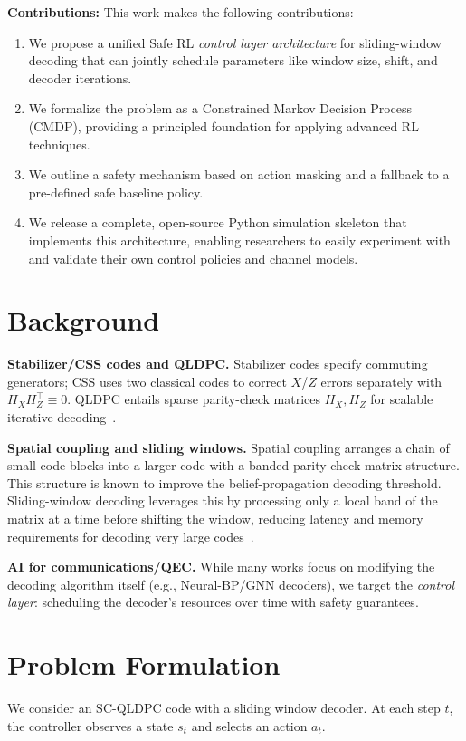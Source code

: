 \documentclass[conference]{IEEEtran}
\begin{document}
\textbf{Contributions:}
This work makes the following contributions:
\begin{enumerate}
    \item We propose a unified Safe RL \emph{control layer architecture} for sliding-window decoding that can jointly schedule parameters like window size, shift, and decoder iterations.
    \item We formalize the problem as a Constrained Markov Decision Process (CMDP), providing a principled foundation for applying advanced RL techniques.
    \item We outline a safety mechanism based on action masking and a fallback to a pre-defined safe baseline policy.
    \item We release a complete, open-source Python simulation skeleton that implements this architecture, enabling researchers to easily experiment with and validate their own control policies and channel models.
\end{enumerate}

\section{Background}
\textbf{Stabilizer/CSS codes and QLDPC.} Stabilizer codes specify commuting generators; CSS uses two classical codes to correct $X$/$Z$ errors separately with $H_X H_Z^\top \equiv 0$. QLDPC entails sparse parity-check matrices $H_X,H_Z$ for scalable iterative decoding~\cite{panteleev2021quantum}.

\textbf{Spatial coupling and sliding windows.} Spatial coupling arranges a chain of small code blocks into a larger code with a banded parity-check matrix structure. This structure is known to improve the belief-propagation decoding threshold. Sliding-window decoding leverages this by processing only a local band of the matrix at a time before shifting the window, reducing latency and memory requirements for decoding very large codes~\cite{fosson2021survey}.

\textbf{AI for communications/QEC.} While many works focus on modifying the decoding algorithm itself (e.g., Neural-BP/GNN decoders), we target the \emph{control layer}: scheduling the decoder's resources over time with safety guarantees.

\section{Problem Formulation}
We consider an SC-QLDPC code with a sliding window decoder. At each step $t$, the controller observes a state $s_t$ and selects an action $a_t$.
\end{document}
